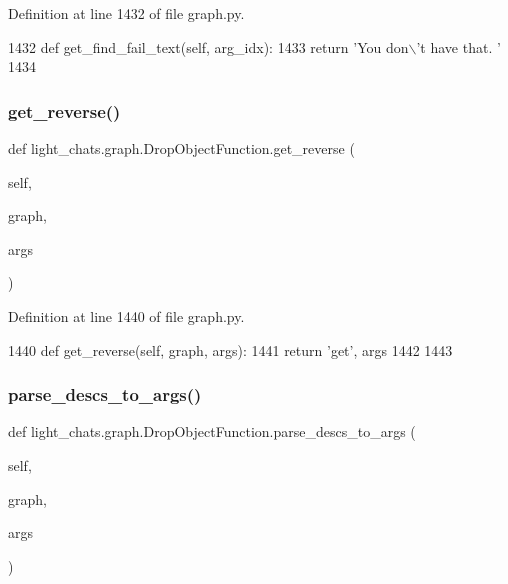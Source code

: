 Definition at line 1432 of file graph.\+py.


\begin{DoxyCode}
1432     \textcolor{keyword}{def }get\_find\_fail\_text(self, arg\_idx):
1433         \textcolor{keywordflow}{return} \textcolor{stringliteral}{'You don\(\backslash\)'t have that. '}
1434 
\end{DoxyCode}
\mbox{\label{classlight__chats_1_1graph_1_1DropObjectFunction_a6708badf2a02ba13bcf40b0a01caaf37}} 
\subsubsection{\texorpdfstring{get\+\_\+reverse()}{get\_reverse()}}
{\footnotesize\ttfamily def light\+\_\+chats.\+graph.\+Drop\+Object\+Function.\+get\+\_\+reverse (\begin{DoxyParamCaption}\item[{}]{self,  }\item[{}]{graph,  }\item[{}]{args }\end{DoxyParamCaption})}



Definition at line 1440 of file graph.\+py.


\begin{DoxyCode}
1440     \textcolor{keyword}{def }get\_reverse(self, graph, args):
1441         \textcolor{keywordflow}{return} \textcolor{stringliteral}{'get'}, args
1442 
1443 
\end{DoxyCode}
\mbox{\label{classlight__chats_1_1graph_1_1DropObjectFunction_abd2a91a5d3fd3acb95c37fafed688aa0}} 
\subsubsection{\texorpdfstring{parse\+\_\+descs\+\_\+to\+\_\+args()}{parse\_descs\_to\_args()}}
{\footnotesize\ttfamily def light\+\_\+chats.\+graph.\+Drop\+Object\+Function.\+parse\+\_\+descs\+\_\+to\+\_\+args (\begin{DoxyParamCaption}\item[{}]{self,  }\item[{}]{graph,  }\item[{}]{args }\end{DoxyParamCaption})}




